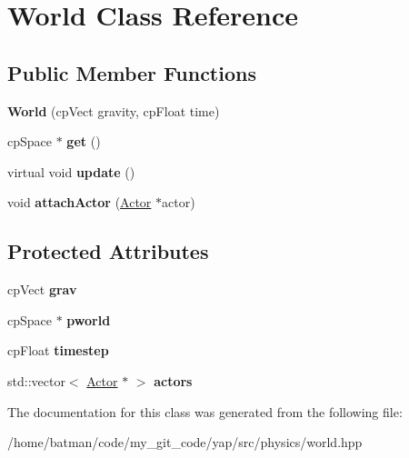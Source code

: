 \hypertarget{classWorld}{}\section{World Class Reference}
\label{classWorld}
\subsection*{Public Member Functions}
\begin{DoxyCompactItemize}
\item 
\hypertarget{classWorld_afd25e14cb9229826064e6dc9a372d688}{}{\bfseries World} (cp\+Vect gravity, cp\+Float time)\label{classWorld_afd25e14cb9229826064e6dc9a372d688}

\item 
\hypertarget{classWorld_ac6c94c5ac13d057c6748cc9feb03d849}{}cp\+Space $\ast$ {\bfseries get} ()\label{classWorld_ac6c94c5ac13d057c6748cc9feb03d849}

\item 
\hypertarget{classWorld_ae69934936f105df69f4fbaf9d7e4be6b}{}virtual void {\bfseries update} ()\label{classWorld_ae69934936f105df69f4fbaf9d7e4be6b}

\item 
\hypertarget{classWorld_a41f336246fda93567233e6441c800433}{}void {\bfseries attach\+Actor} (\hyperlink{classActor}{Actor} $\ast$actor)\label{classWorld_a41f336246fda93567233e6441c800433}

\end{DoxyCompactItemize}
\subsection*{Protected Attributes}
\begin{DoxyCompactItemize}
\item 
\hypertarget{classWorld_a484d43ac4b72629d4d32b8eaa51f707e}{}cp\+Vect {\bfseries grav}\label{classWorld_a484d43ac4b72629d4d32b8eaa51f707e}

\item 
\hypertarget{classWorld_a4fb8abef966c6d9750e75ffafa36566e}{}cp\+Space $\ast$ {\bfseries pworld}\label{classWorld_a4fb8abef966c6d9750e75ffafa36566e}

\item 
\hypertarget{classWorld_a0e13789989b30b7314e6e376d600bd24}{}cp\+Float {\bfseries timestep}\label{classWorld_a0e13789989b30b7314e6e376d600bd24}

\item 
\hypertarget{classWorld_aea7c237000a3b38c8e2d1c56202ab649}{}std\+::vector$<$ \hyperlink{classActor}{Actor} $\ast$ $>$ {\bfseries actors}\label{classWorld_aea7c237000a3b38c8e2d1c56202ab649}

\end{DoxyCompactItemize}


The documentation for this class was generated from the following file\+:\begin{DoxyCompactItemize}
\item 
/home/batman/code/my\+\_\+git\+\_\+code/yap/src/physics/world.\+hpp\end{DoxyCompactItemize}
